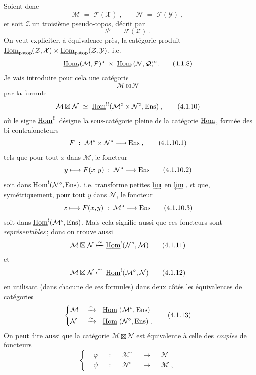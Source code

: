 Soient donc
\[
\mathcal{M} \;=\; \mathcal{F}(\mathcal{X})\;, \qquad \mathcal{N} \;=\; \mathcal{F}(\mathcal{Y})\;,
\tag*{(4.1.6)}
\]
et soit $\mathcal{Z}$ un troisième pseudo-topos, décrit par
\[
\mathcal{P} \;=\; \mathcal{F}(\mathcal{Z})\;.
\tag*{(4.1.7)}
\]
On veut expliciter, à équivalence près, la catégorie produit $\underline{\mathrm{Hom}}_{\mathrm{pstop}}(\mathcal{Z},\mathcal{X})\times\underline{\mathrm{Hom}}_{\mathrm{pstop}}(\mathcal{Z},\mathcal{Y})$, i.e.
\[
\underline{\mathrm{Hom}}_!(\mathcal{M},\mathcal{P})^\circ \;\times\; \underline{\mathrm{Hom}}_!(\mathcal{N},\mathcal{Q})^\circ.
\tag*{(4.1.8)}
\] %
Je vais introduire pour cela une catégorie
\[
\mathcal{M}\boxtimes\mathcal{N}
\tag*{(4.1.9)}
\]
par la formule
\[
\mathcal{M}\boxtimes\mathcal{N} \;\simeq\; \underline{\mathrm{Hom}}^{!!}(\mathcal{M}^\circ\times\mathcal{N}^\circ,\mathrm{Ens})\;,
\tag*{(4.1.10)}
\]
où le signe $\underline{\mathrm{Hom}}^{!!}$ désigne la sous-catégorie pleine de la catégorie $\underline{\mathrm{Hom}}$, formée des bi-contrafoncteurs %
\[
F \;:\; \mathcal{M}^\circ\times\mathcal{N}^\circ \longrightarrow \mathrm{Ens}\;,
\tag*{(4.1.10.1)}
\]
tels que pour tout $x$ dans $\mathcal{M}$, le foncteur
\[
y \longmapsto F(x,y) \;:\; \mathcal{N}^\circ \longrightarrow \mathrm{Ens}
\tag*{(4.1.10.2)}
\]
soit dans $\underline{\mathrm{Hom}}^!(\mathcal{N}^\circ,\mathrm{Ens})$, i.e. transforme petites $\varinjlim$ en $\varprojlim$\,, et que, symétriquement, pour tout $y$ dans $\mathcal{N}$, le foncteur
\[
x \longmapsto F(x,y) \;:\; \mathcal{M}^\circ \longrightarrow \mathrm{Ens}
\tag*{(4.1.10.3)}
\]
soit dans $\underline{\mathrm{Hom}}^!(\mathcal{M}^\circ,\mathrm{Ens})$. Mais cela signifie aussi que ces foncteurs sont \textit{représentables}\,; donc on trouve aussi
\[
\mathcal{M}\boxtimes\mathcal{N} \xleftarrow{\sim} \underline{\mathrm{Hom}}^!(\mathcal{N}^\circ,\mathcal{M})
\tag*{(4.1.11)}
\]
et
\[
\mathcal{M}\boxtimes\mathcal{N} \xleftarrow{\sim} \underline{\mathrm{Hom}}^!(\mathcal{M}^\circ,\mathcal{N})
\tag*{(4.1.12)}
\]
en utilisant (dans chacune de ces formules) dans deux côtés les équivalences de catégories
\[
\left\{
\begin{aligned}
&\mathcal{M} &&\xrightarrow{\sim} &&\underline{\mathrm{Hom}}^!(\mathcal{M}^\circ,\mathrm{Ens})\\
&\mathcal{N} &&\xrightarrow{\sim} &&\underline{\mathrm{Hom}}^!(\mathcal{N}^\circ,\mathrm{Ens})\;.
\end{aligned}
\right.
\tag*{(4.1.13)}
\]
On peut dire aussi que la catégorie $\mathcal{M}\boxtimes\mathcal{N}$ est équivalente à celle des \textit{couples} de foncteurs
\[
\left\{
\begin{aligned}
&\varphi &&: &&\mathcal{M}^\circ &&\longrightarrow &&\mathcal{N}\\
&\psi &&: &&\mathcal{N}^\circ &&\longrightarrow &&\mathcal{M}\;,
\end{aligned}
\right.
\tag*{(4.1.14)}
\]
